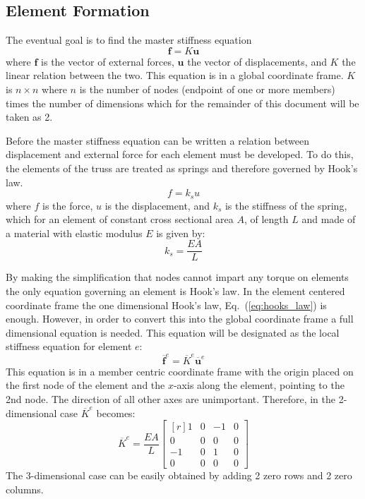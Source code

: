 \documentclass{article}
\begin{document}
\subsection{Element Formation}

The eventual goal is to find the master stiffness equation
\begin{equation}
    \mathbf{f}=K\mathbf{u} \label{eq:master_stiffness_equation}
\end{equation}
where $\mathbf{f}$ is the vector of external forces, $\mathbf{u}$ the vector
of displacements, and $K$ the linear relation between the two.  This equation
is in a global coordinate frame.  $K$ is $n\times{}n$ where $n$ is the number
of nodes (endpoint of one or more members) times the number of dimensions
which for the remainder of this document will be taken as 2.

Before the master stiffness equation can be written a relation between
displacement and external force for each element must be developed.  To do
this, the elements of the truss are treated as springs and therefore governed
by Hook's law.
\begin{equation}
    f=k_su \label{eq:hooks_law}
\end{equation}
where $f$ is the force, $u$ is the displacement, and $k_s$ is the stiffness of
the spring, which for an element of constant cross sectional area $A$, of
length $L$ and made of a material with elastic modulus $E$ is given by:
\begin{equation}
    k_s=\frac{EA}{L} \label{eq:stiffness_coefficient}
\end{equation}

By making the simplification that nodes cannot impart any torque on elements
the only equation governing an element is Hook's law.  In the element centered
coordinate frame the one dimensional Hook's law, Eq.~(\ref{eq:hooks_law}) is
enough.  However, in order to convert this into the global coordinate frame a
full dimensional equation is needed.  This equation will be designated as the
local stiffness equation for element $e$:
\begin{equation}
    \overline{\mathbf{f}}^e=\overline{K}^e\overline{\mathbf{u}}^e
    \label{eq:local_stiffness_equation}
\end{equation}
This equation is in a member centric coordinate frame with the origin placed
on the first node of the element and the $x$-axis along the element, pointing
to the 2nd node.  The direction of all other axes are unimportant.  Therefore,
in the 2-dimensional case $\overline{K}^e$ becomes:
\begin{equation}
    \overline{K}^e=\frac{EA}{L}\begin{bmatrix*}[r]
        1&0&-1&0\\
        0&0&0&0\\
        -1&0&1&0\\
        0&0&0&0
    \end{bmatrix*} \label{eq:kbar}
\end{equation}
The 3-dimensional case can be easily obtained by adding 2 zero rows and 2 zero
columns.
\end{document}
